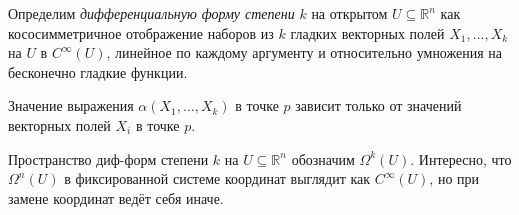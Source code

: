 \begin{to_def} 
    Определим \textit{дифференциальную форму степени} $k$ на открытом $U \subseteq \mathbb{R}^n$ как кососимметричное отображение наборов из $k$ гладких векторных полей $X_1, \ldots, X_k$ на $U$ в $C^{\infty}(U)$, линейное по каждому аргументу и относительно умножения на бесконечно гладкие функции.
\end{to_def}

\begin{to_lem} 
    Значение выражения $\alpha(X_1, \ldots, X_k)$ в точке $p$ зависит только от значений векторных полей $X_i$ в точке $p$.     
\end{to_lem}

Пространство диф-форм степени $k$ на $U \subseteq \mathbb{R}^n$ обозначим $\Omega^k(U)$. Интересно, что $\Omega^n(U)$ в фиксированной системе координат выглядит как $C^{\infty}(U)$, но при замене координат ведёт себя иначе.







